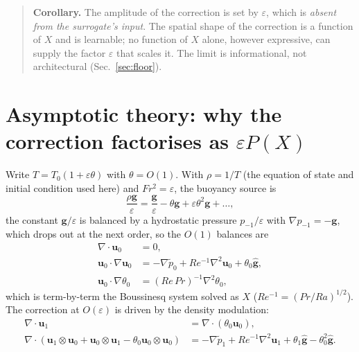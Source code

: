 \documentclass[preprint,11pt,a4paper,times,doubleblind]{elsarticle}
\begin{document}
\begin{quote}
\noindent\textbf{Corollary.} The amplitude of the correction is set by $\varepsilon$, which is
\emph{absent from the surrogate's input}. The spatial shape of the correction is a function of $X$
and is learnable; no function of $X$ alone, however expressive, can supply the factor
$\varepsilon$ that scales it. The limit is informational, not architectural
(Sec.~\ref{sec:floor}).
\end{quote}

\section{Asymptotic theory: why the correction factorises as $\varepsilon P(X)$}
\label{sec:theory}

Write $T=T_0(1+\varepsilon\theta)$ with $\theta=O(1)$. With $\rho=1/T$ (the equation of state and
initial condition used here) and $Fr^2=\varepsilon$, the buoyancy source is
\begin{equation}
\frac{\rho\bm g}{\varepsilon}=\frac{\bm g}{\varepsilon}-\theta\bm g+\varepsilon\theta^2\bm g+\dots,
\label{eq:buoyancy}
\end{equation}
the constant $\bm g/\varepsilon$ is balanced by a hydrostatic pressure $p_{-1}/\varepsilon$ with
$\nabla p_{-1}=-\bm g$, which drops out at the next order, so the $O(1)$ balances are
\begin{align}
\nabla\cdot\bm u_0&=0,\label{eq:o1mass}\\
\bm u_0\cdot\nabla\bm u_0&=-\nabla\tilde p_0+Re^{-1}\nabla^2\bm u_0+\theta_0\hat{\bm g},\label{eq:o1mom}\\
\bm u_0\cdot\nabla\theta_0&=(Re\,Pr)^{-1}\nabla^2\theta_0,\label{eq:o1energy}
\end{align}
which is term-by-term the Boussinesq system solved as $X$ ($Re^{-1}=(Pr/Ra)^{1/2}$). The
correction at $O(\varepsilon)$ is driven by the density modulation:
\begin{align}
\nabla\cdot\bm u_1&=\nabla\cdot(\theta_0\bm u_0),\label{eq:div1}\\
\nabla\cdot(\bm u_1\otimes\bm u_0+\bm u_0\otimes\bm u_1-\theta_0\bm u_0\otimes\bm u_0)
&=-\nabla\tilde p_1+Re^{-1}\nabla^2\bm u_1+\theta_1\hat{\bm g}-\theta_0^2\hat{\bm g}.\label{eq:mom1}
\end{align}
\end{document}
